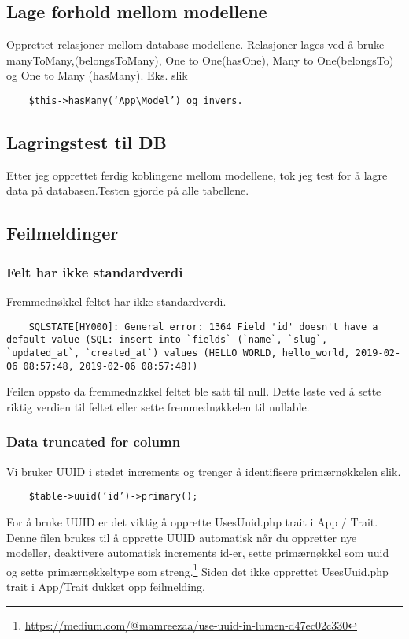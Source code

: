 \subsection{Lage forhold mellom modellene}
Opprettet relasjoner mellom database-modellene. 
Relasjoner  lages ved å bruke  manyToMany,(belongsToMany), One to One(hasOne), Many to One(belongsTo) og  One to Many (hasMany). Eks.  slik  

\begin{lstlisting}
    $this->hasMany(‘App\Model’) og invers.
\end{lstlisting}

\subsection{Lagringstest til DB}
Etter jeg opprettet ferdig koblingene mellom modellene, tok jeg test for å lagre data på databasen.Testen gjorde på alle tabellene.

\subsection{Feilmeldinger}
\subsubsection{Felt har ikke  standardverdi}
Fremmednøkkel feltet har ikke  standardverdi.

\begin{lstlisting}
    SQLSTATE[HY000]: General error: 1364 Field 'id' doesn't have a default value (SQL: insert into `fields` (`name`, `slug`, `updated_at`, `created_at`) values (HELLO WORLD, hello_world, 2019-02-06 08:57:48, 2019-02-06 08:57:48))
\end{lstlisting}

Feilen oppsto da fremmednøkkel feltet ble satt til null. Dette løste ved å sette riktig verdien til feltet eller sette fremmednøkkelen til nullable. 

\subsubsection{Data truncated for column}
Vi bruker UUID i stedet increments og trenger å identifisere primærnøkkelen slik.
\begin{lstlisting}
    $table->uuid(‘id’)->primary();
\end{lstlisting}

For å bruke UUID er det viktig å opprette UsesUuid.php trait i App / Trait.
Denne filen brukes til å opprette UUID automatisk når du oppretter nye modeller, deaktivere automatisk increments id-er, sette primærnøkkel som uuid og sette primærnøkkeltype som streng.\footnote{
\url{https://medium.com/@mamreezaa/use-uuid-in-lumen-d47ec02c330}}
Siden det ikke opprettet UsesUuid.php trait i App/Trait dukket opp feilmelding. 

